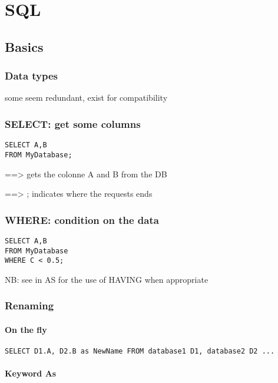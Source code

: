 \chapter{SQL}

\section{Basics}


	\subsection{Data types}
		 some seem redundant, exist for compatibility

	\subsection{SELECT: get some columns}

\begin{lstlisting}
SELECT A,B
FROM MyDatabase;
\end{lstlisting}

	==> gets the colonne A and B from the DB

	==> ; indicates where the requests ends


	\subsection{WHERE: condition on the data}

\begin{lstlisting}
SELECT A,B
FROM MyDatabase
WHERE C < 0.5;
\end{lstlisting}

NB: see in AS for the use of HAVING when appropriate

	\subsection{Renaming}

		\subsubsection{On the fly}

\begin{lstlisting}
SELECT D1.A, D2.B as NewName FROM database1 D1, database2 D2 ...
\end{lstlisting}

		\subsubsection{Keyword As}

